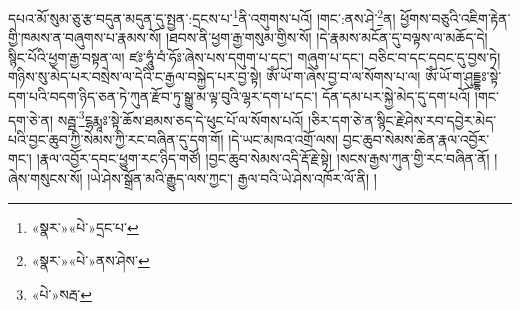 དཔའ་མོ་སུམ་ཅུ་རྩ་བདུན་མདུན་དུ་སྤྱན་:དྲངས་པ་\footnote{«སྣར་»«པེ་»དྲང་པ་}ནི་འགུགས་པའོ། །གང་:ནས་ཤེ་\footnote{«སྣར་»«པེ་»ནས་ཤེས་}ན། ཕྱོགས་བཅུའི་འཇིག་རྟེན་གྱི་ཁམས་ན་བཞུགས་པ་རྣམས་སོ། །ཐབས་ནི་ཕྱག་རྒྱ་གསུམ་གྱིས་སོ། །དེ་རྣམས་མངོན་དུ་བལྟས་ལ་མཆོད་དེ། སྙིང་པོའི་ཕྱག་རྒྱ་བསྟན་ལ། ཛཿ་ཧཱུཾ་བཾ་ཧོཿ་ཞེས་པས་དགུག་པ་དང་། གཞུག་པ་དང་། བཅིང་བ་དང་དབང་དུ་བྱས་ཏེ། གཉིས་སུ་མེད་པར་བསྲེས་ལ་དེའི་ང་རྒྱལ་བསྐྱེད་པར་བྱ་སྟེ། ཨོཾ་ཡོ་ག་ཞེས་བྱ་བ་ལ་སོགས་པ་ལ། ཨོཾ་ཡོ་ག་ཤུདྡྷཿ་སྟེ་དག་པའི་བདག་ཉིད་ཅན་ཏེ་ཀུན་རྫོབ་ཏུ་སྒྱུ་མ་ལྟ་བུའི་ལྷར་དག་པ་དང་། དོན་དམ་པར་སྐྱེ་མེད་དུ་དག་པའོ། །གང་དག་ཅེ་ན། སརྦྦ་\footnote{«པེ་»སརྦ་}ངྷརྨཱཿ་སྟེ་ཆོས་ཐམས་ཅད་དེ་ཕུང་པོ་ལ་སོགས་པའོ། །ཅིར་དག་ཅེ་ན་སྙིང་རྗེ་ཤེས་རབ་དབྱེར་མེད་པའི་བྱང་ཆུབ་ཀྱི་སེམས་ཀྱི་རང་བཞིན་དུ་དག་གོ། །དེ་ཡང་མཁའ་འགྲོ་ལས། བྱང་ཆུབ་སེམས་ཆེན་རྣལ་འབྱོར་གང་། །རྣལ་འབྱོར་དབང་ཕྱུག་རང་ཉིད་གཙོ། །བྱང་ཆུབ་སེམས་འདི་རྡོ་རྗེ་སྟེ། །སངས་རྒྱས་ཀུན་གྱི་རང་བཞིན་ནོ། །ཞེས་གསུངས་སོ། །ཡེ་ཤེས་སྒྲོན་མའི་རྒྱུད་ལས་ཀྱང་། རྒྱལ་བའི་ཡེ་ཤེས་འཁོར་ལོ་ནི། །
